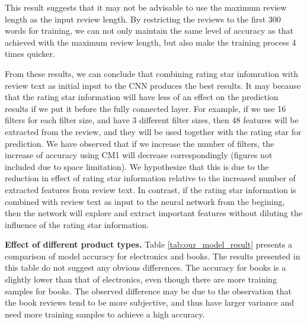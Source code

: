 \documentclass[conference,compsoc]{IEEEtran}
\begin{document}
\begin{table*}[ht]
\end{table*}%
This result suggests that it may not be advisable to use the maximum review length as the input review length. By restricting the reviews to the first 300 words for training, we can not only maintain the same level of accuracy as that achieved with the maximum review length, but also make the training process 4 times quicker.



From these results, we can conclude that combining rating star infomration with review text as initial input to the CNN produces the best results. It may because that the rating star information will have less of an effect on the prediction results if we put it before the fully connected layer. For example, if we use 16 filters for each filter size, and have 3 different filter sizes, then 48 features will be extracted from the review, and they will be used together with the rating star for prediction. We have observed that if we increase the number of filters, the increase of accuracy using CM1 will decrease correspondingly (figures not included due to space limitation). We hypothesize that this is due to the reduction in effect of rating star information relative to the increased number of extracted features from review text. In contrast, if the rating star information is combined with review text as input to the neural network from the begining, then the network will explore and extract important features without diluting the influence of the rating star information.

\textbf{Effect of different product types.} Table \ref{tab:our_model_result} presents a comparison of model accuracy for electronics and books. The results presented in this table do not suggest any obvious differences. The accuracy for books is a slightly lower than that of electronics, even though there are more training samples for books. The observed difference may be due to the observation that the book reviews tend to be more subjective, and thus have larger variance and need more training samples to achieve a high accuracy.
\end{document}
